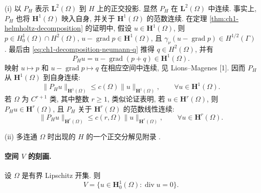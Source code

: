 \begin{Remark}
\label{rem:ch1-summary-results}
(i) 以 $P_H$ 表示 $\mathbf L^2(\Omega)$ 到 $H$ 上的正交投影. 显然 $P_H$ 在 $\mathbf L^2(\Omega)$ 中连续. 事实上, $P_H$ 也将 $\mathbf H^1(\Omega)$ 映入自身, 并关于 $\mathbf H^1(\Omega)$ 的范数连续. 在定理 \ref{thm:ch1-helmholtz-decomposition} 的证明中, 假设 $u\in\mathbf H^1(\Omega)$, 则 $p\in H_0^1(\Omega)\cap H^2(\Omega)$, $u-\operatorname{grad}p\in\mathbf H^1(\Omega)$, 且 $\gamma_\nu(u-\operatorname{grad}p)\in H^{1/2}(\Gamma)$. 最后由 \eqref{eq:ch1-decomposition-neumann-q} 推得 $q\in H^2(\Omega)$, 并有
\[
P_Hu=u-\operatorname{grad}(p+q)\in\mathbf H^1(\Omega).
\]
映射 $u\mapsto p$ 和 $u-\operatorname{grad}p\mapsto q$ 在相应空间中连续, 见 Lions--Magenes [1]. 因而 $P_H$ 从 $\mathbf H^1(\Omega)$ 到自身连续:
\begin{equation}
\lVert P_Hu\rVert_{\mathbf H^1(\Omega)}
\leq c(\Omega)\lVert u\rVert_{\mathbf H^1(\Omega)},
\qquad\forall u\in\mathbf H^1(\Omega).
\label{eq:ch1-helmholtz-projection-h1-bound}
\end{equation}
若 $\Omega$ 为 $C^{r+1}$ 类, 其中整数 $r\geq1$, 类似论证表明, 若 $u\in\mathbf H^r(\Omega)$, 则 $P_Hu\in\mathbf H^r(\Omega)$, 且 $P_H$ 关于 $\mathbf H^r(\Omega)$ 的范数线性连续:
\begin{equation}
\lVert P_Hu\rVert_{\mathbf H^r(\Omega)}
\leq c(r,\Omega)\lVert u\rVert_{\mathbf H^r(\Omega)},
\qquad\forall u\in\mathbf H^r(\Omega).
\label{eq:ch1-helmholtz-projection-hr-bound}
\end{equation}

(ii) 多连通 $\Omega$ 时出现的 $H$ 的一个正交分解见附录 .
\end{Remark}

\paragraph{空间 $V$ 的刻画.}

\begin{Theorem}
\label{thm:ch1-characterization-v}
设 $\Omega$ 是有界 Lipschitz 开集. 则
\begin{equation}
V=\{u\in\mathbf H_0^1(\Omega):\operatorname{div}u=0\}.
\label{eq:ch1-v-characterization}
\end{equation}
\end{Theorem}

